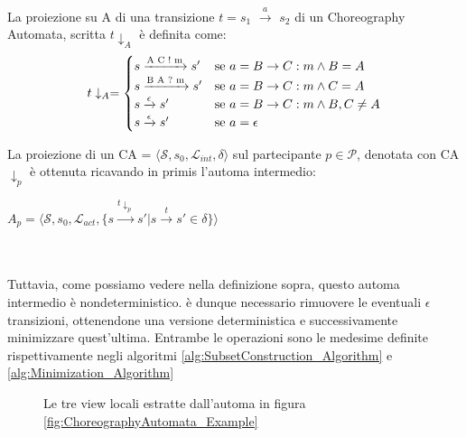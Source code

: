 \begin{definition}[Proiezione]
    La proiezione su A di una transizione $t = s_1$ $\xrightarrow{a}$ $s_2$ di un Choreography Automata, scritta $t\downarrow_{A}$ è definita come:
    \begin{equation*}
        t \downarrow_{A} =
        \begin{cases}
            s \xrightarrow{\text{A C ! m}} s' & $se $ a = B \rightarrow C : m \wedge B = A       \\
            s \xrightarrow{\text{B A ? m}} s' & $se $ a = B \rightarrow C : m \wedge C = A       \\
            s \xrightarrow{\epsilon} s'       & $se $ a = B \rightarrow C : m \wedge B, C \neq A \\
            s \xrightarrow{\epsilon} s'       & $se $ a = \epsilon
        \end{cases}
    \end{equation*}
\end{definition}
La proiezione di un CA = $\langle \mathcal{S}, s_0, \mathcal{L}_{int}, \delta \rangle$ sul partecipante $p \in \mathcal{P}$, denotata con CA$\downarrow_p$ è ottenuta ricavando in primis l'automa intermedio:
\bigskip \\
\centerline{$A_p = \langle \mathcal{S}, s_0, \mathcal{L}_{act}, \{ s \xrightarrow{t\downarrow_{p}} s' | s \xrightarrow{t} s' \in \delta \} \rangle$}
\\ \\
Tuttavia, come possiamo vedere nella definizione sopra, questo automa intermedio è nondeterministico. è dunque necessario rimuovere le eventuali $\epsilon$ transizioni, ottenendone una versione deterministica e successivamente minimizzare quest'ultima. Entrambe le operazioni sono le medesime definite rispettivamente negli algoritmi \ref{alg:SubsetConstruction_Algorithm} e \ref{alg:Minimization_Algorithm}

\begin{figure}[ht]
    \centering
    \caption{Le tre view locali estratte dall'automa in figura \ref{fig:ChoreographyAutomata_Example}}
    \label{fig:Projection_Example}
\end{figure}

